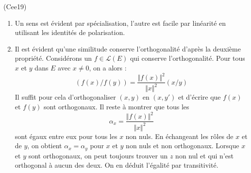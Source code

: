 \begin{tiny}(Cee19)\end{tiny}
\begin{enumerate}
 \item Un sens est évident par spécialisation, l'autre est facile par linéarité en utilisant les identités de polarisation. 
 \item Il est évident qu'une similitude conserve l'orthogonalité d'après la deuxième propriété.\newline
Considérons un $f\in\mathcal{L}(E)$ qui conserve l'orthogonalité.\newline
Pour tous $x$ et $y$ dans $E$ avec $x\neq 0$, on a alors :
\begin{displaymath}
 (f(x)/f(y)) = \frac{\Vert f(x) \Vert ^2}{\Vert x \Vert ^2} (x/y)
\end{displaymath}
Il suffit pour cela d'orthogonaliser $(x,y)$ en $(x,y')$ et d'écrire que $f(x)$ et $f(y)$ sont orthogonaux.\newline
Il reste à montrer que tous les 
\begin{displaymath}
 \alpha_x = \frac{\Vert f(x) \Vert ^2}{\Vert x \Vert ^2}
\end{displaymath}
sont égaux entre eux pour tous les $x$ non nuls.\newline
En échangeant les rôles de $x$ et de $y$, on obtient $\alpha_x = \alpha_y$ pour $x$ et $y$ non nuls et non orthogonaux. Lorsque $x$ et $y$ sont orthogonaux, on peut toujours trouver un $z$ non nul et qui n'est orthogonal à aucun des deux. On en déduit l'égalité par transitivité.
\end{enumerate}
 